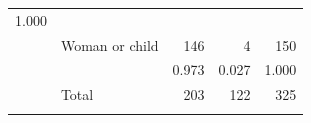 \documentclass[11pt,a4paper,openany]{book}
\begin{document}
\begin{longtable}[]{@{}llrrr@{}}
\begin{minipage}[t]{0.07\columnwidth}
1.000\strut
\end{minipage}\tabularnewline
\begin{minipage}[t]{0.30\columnwidth}\raggedright\strut
\strut
\end{minipage} & \begin{minipage}[t]{0.14\columnwidth}\raggedright\strut
Woman or child\strut
\end{minipage} & \begin{minipage}[t]{0.27\columnwidth}\raggedleft\strut
146\strut
\end{minipage} & \begin{minipage}[t]{0.07\columnwidth}\raggedleft\strut
4\strut
\end{minipage} & \begin{minipage}[t]{0.07\columnwidth}\raggedleft\strut
150\strut
\end{minipage}\tabularnewline
\begin{minipage}[t]{0.30\columnwidth}\raggedright\strut
\strut
\end{minipage} & \begin{minipage}[t]{0.14\columnwidth}\raggedright\strut
\strut
\end{minipage} & \begin{minipage}[t]{0.27\columnwidth}\raggedleft\strut
0.973\strut
\end{minipage} & \begin{minipage}[t]{0.07\columnwidth}\raggedleft\strut
0.027\strut
\end{minipage} & \begin{minipage}[t]{0.07\columnwidth}\raggedleft\strut
1.000\strut
\end{minipage}\tabularnewline
\begin{minipage}[t]{0.30\columnwidth}\raggedright\strut
\strut
\end{minipage} & \begin{minipage}[t]{0.14\columnwidth}\raggedright\strut
Total\strut
\end{minipage} & \begin{minipage}[t]{0.27\columnwidth}\raggedleft\strut
203\strut
\end{minipage} & \begin{minipage}[t]{0.07\columnwidth}\raggedleft\strut
122\strut
\end{minipage} & \begin{minipage}[t]{0.07\columnwidth}\raggedleft\strut
325\strut
\end{minipage}\tabularnewline
\begin{minipage}[t]{0.30\columnwidth}\raggedright\strut

\end{minipage}
\end{longtable}
\end{document}
